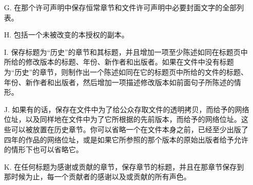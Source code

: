 \begin{itemize}
    \item[G.] 在那个许可声明中保存恒常章节和文件许可声明中必要封面文字的全部列表。 
    \item[H.] 包括一个未被改变的本授权的副本。
    \item[I.] 保存标题为``历史''的章节和其标题，并且增加一项至少陈述如同在标题页中所给的修改版本的标题、年份、新作者和出版者。如果在文件中没有标题为``历史''的章节，则制作出一个陈述如同在它的标题页中所给的文件的标题、年份、新作者和出版者，然后增加一项描述修改版本如前面句子所陈述的情形。
    \item[J.] 如果有的话，保存在文件中为了给公众存取文件的透明拷贝，而给予的网络位址，以及同样地在文件中为了它所根据的先前版本，而给予的网络位址。这些可以被放置在历史章节。你可以省略一个在文件本身之前，已经至少出版了四年的作品的网络位址，或是如果它所参照的那个版本的原始出版者给予允许的情形下也可以省略它。
    \item[K.] 在任何标题为感谢或贡献的章节，保存章节的标题，并且在那章节保存到那时候为止，每一个贡献者的感谢以及或贡献的所有声色。

\end{itemize}
